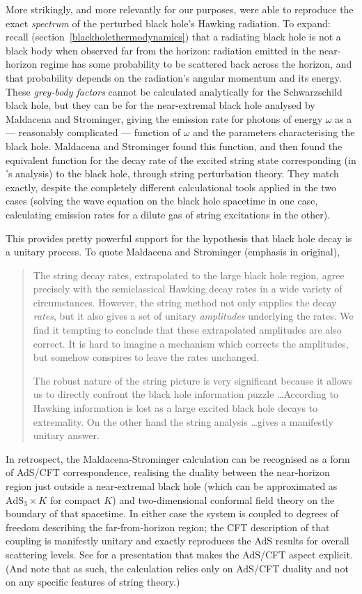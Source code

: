 \documentclass{article}
\newcommand{\AdS}{\mbox{AdS}}
\begin{document}
More strikingly, and more relevantly for our purposes,  were able to reproduce the exact \emph{spectrum} of the perturbed black hole's Hawking radiation. To expand: recall (section~\ref{blackholethermodynamics}) that a radiating black hole is not  a black body when observed far from the horizon: radiation emitted in the near-horizon regime has some probability to be scattered back across the horizon, and that probability depends on the radiation's angular momentum and its energy. These \emph{grey-body factors} cannot be calculated analytically for the Schwarzschild black hole, but they can be for the near-extremal black hole analysed by Maldacena and Strominger, giving the emission rate for photons of energy $\omega$ as a --- reasonably complicated --- function of $\omega$ and the parameters characterising the black hole. Maldacena and Strominger found this function, and then found the equivalent function for the decay rate of the excited string state corresponding (in 's analysis) to the black hole, through string perturbation theory. They match exactly, despite the completely different calculational tools applied in the two cases (solving the wave equation on the black hole spacetime in one case, calculating emission rates for a dilute gas of string excitations in the other).

This provides pretty powerful support for the hypothesis that black hole decay is a unitary process. To quote Maldacena and Strominger (emphasis in original),
\begin{quote}
The string decay rates, extrapolated to the large black hole region, agree precisely with the semiclassical Hawking decay rates in a wide variety of circumstances. However, the string method not only supplies the decay \emph{rates}, but it also gives a set of unitary \emph{amplitudes} underlying the rates. We find it tempting to conclude that these extrapolated amplitudes are also correct. It is hard to imagine a mechanism which corrects the amplitudes, but somehow conspires to leave the rates unchanged.

The robust nature of the string picture is very significant because it allows us to directly confront the black hole information puzzle \ldots According to Hawking information is lost as a large excited black hole decays to extremality. On the other hand the string analysis \ldots gives a manifestly unitary answer.
\end{quote}

In retrospect, the Maldacena-Strominger calculation can be recognised as a form of AdS/CFT correspondence, realising the duality between the near-horizon region just outside a near-extremal black hole (which can be approximated as $\AdS_3 \times K$ for compact $K$) and two-dimensional conformal field theory on the boundary of that spacetime. In either case the system is coupled to degrees of freedom describing the far-from-horizon region; the CFT description of that coupling is manifestly unitary and exactly reproduces the AdS results for overall scattering levels. See  for a presentation that makes the AdS/CFT aspect explicit. (And note that as such, the calculation relies only on AdS/CFT duality and not on any specific features of string theory.)
\end{document}
